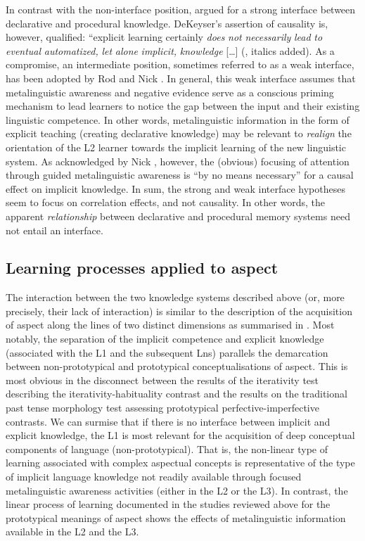 \documentclass[output=paper,modfonts,nonflat,newtxmath]{langsci/langscibook}
\begin{document}
In contrast with the non-interface position, \citet{DeKeyser2003, DeKeyser2009} argued for a strong interface between declarative and procedural knowledge. DeKeyser’s assertion of causality is, however, qualified: “explicit learning certainly \textit{does} \textit{not} \textit{necessarily} \textit{lead} \textit{to} \textit{eventual} \textit{automatized,} \textit{let} \textit{alone} \textit{implicit,} \textit{knowledge} […] (\citealt[126]{DeKeyser2009}, italics added). As a compromise, an intermediate position, sometimes referred to as a weak interface, has been adopted by Rod \citet{EllisR1993, EllisR2008} and Nick \citet{Ellis2005}. In general, this weak interface assumes that metalinguistic awareness and negative evidence serve as a conscious priming mechanism to lead learners to notice the gap between the input and their existing linguistic competence. In other words, metalinguistic information in the form of explicit teaching (creating declarative knowledge) may be relevant to \textit{realign} the orientation of the L2 learner towards the implicit learning of the new linguistic system. As acknowledged by Nick \citet[330]{Ellis2005}, however, the (obvious) focusing of attention through guided metalinguistic awareness is “by no means necessary” for a causal effect on implicit knowledge. In sum, the strong and weak interface hypotheses seem to focus on correlation effects, and not causality. In other words, the apparent \textit{relationship} between declarative and procedural memory systems need not entail an interface.

\subsection{Learning {processes} {applied} {to} {aspect}} %
\label{sec:salaberry:2.3}

The interaction between the two knowledge systems described above (or, more precisely, their lack of interaction) is similar to the description of the acquisition of aspect along the lines of two distinct dimensions as summarised in . Most notably, the separation of the implicit competence and explicit knowledge (associated with the L1 and the subsequent Lns) parallels the demarcation between non-prototypical and prototypical conceptualisations of aspect. This is most obvious in the disconnect between the results of the iterativity test describing the iterativity-habituality contrast and the results on the traditional past tense morphology test assessing prototypical perfective-imperfective contrasts. We can surmise that if there is no interface between implicit and explicit knowledge, the L1 is most relevant for the acquisition of deep conceptual components of language (non-prototypical). That is, the non-linear type of learning associated with complex aspectual concepts is representative of the type of implicit language knowledge not readily available through focused metalinguistic awareness activities (either in the L2 or the L3). In contrast, the linear process of learning documented in the studies reviewed above for the prototypical meanings of aspect shows the effects of metalinguistic information available in the L2 and the L3.
\end{document}
